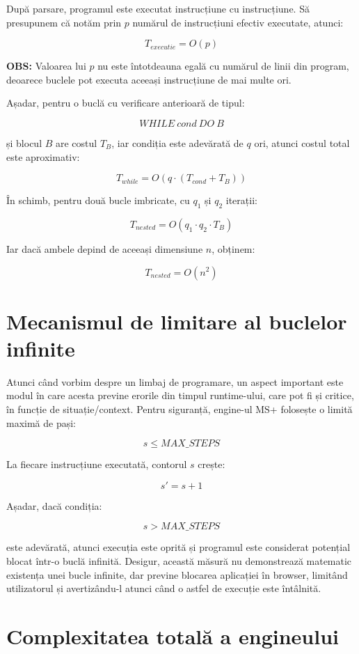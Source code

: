 \documentclass[12pt]{article}
\begin{document}
După parsare, programul este executat instrucțiune cu instrucțiune. Să presupunem că notăm prin \(p\) numărul de instrucțiuni efectiv executate, atunci:

\[
T_{executie} = O(p)
\]

\textbf{OBS:} Valoarea lui \(p\) nu este întotdeauna egală cu numărul de linii din program, deoarece buclele pot executa aceeași instrucțiune de mai multe ori.

Așadar, pentru o buclă cu verificare anterioară de tipul:

\[
WHILE \ cond \ DO \ B
\]

și blocul \(B\) are costul \(T_B\), iar condiția este adevărată de \(q\) ori, atunci costul total este aproximativ:

\[
T_{while} = O(q \cdot (T_{cond} + T_B))
\]

În schimb, pentru două bucle imbricate, cu \(q_1\) și \(q_2\) iterații:

\[
T_{nested} = O(q_1 \cdot q_2 \cdot T_B)
\]

Iar dacă ambele depind de aceeași dimensiune \(n\), obținem:

\[
T_{nested} = O(n^2)
\]

\section{Mecanismul de limitare al buclelor infinite}

Atunci când vorbim despre un limbaj de programare, un aspect important este modul în care acesta previne erorile din timpul runtime-ului, care pot fi și critice, în funcție de situație/context. Pentru siguranță, engine-ul MS+ folosește o limită maximă de pași:

\[
s \leq MAX\_STEPS
\]

La fiecare instrucțiune executată, contorul \(s\) crește:

\[
s' = s + 1
\]

Așadar, dacă condiția:

\[
s > MAX\_STEPS
\]

este adevărată, atunci execuția este oprită și programul este considerat potențial blocat într-o buclă infinită. Desigur, această măsură nu demonstrează matematic existența unei bucle infinite, dar previne blocarea aplicației în browser, limitând utilizatorul și avertizându-l atunci când o astfel de execuție este întâlnită.

\section{Complexitatea totală a engineului}
\end{document}
